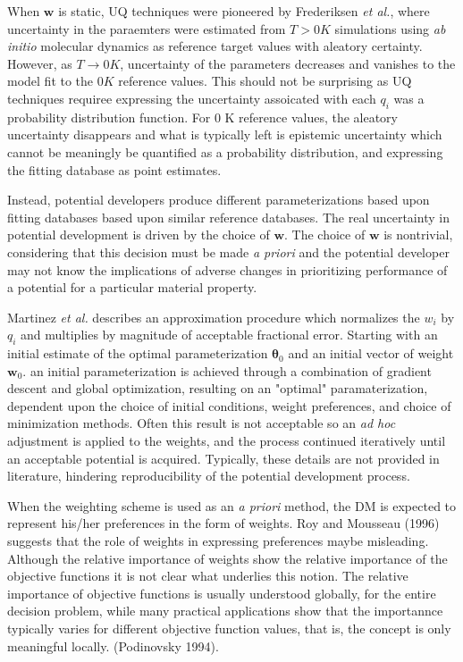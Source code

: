 When $\bm{w}$ is static,  UQ techniques were pioneered by Frederiksen \emph{et al.}\cite{frederiksen2004_md_bayes}, where uncertainty in the paraemters were estimated from $T > 0K$ simulations using \emph{ab initio} molecular dynamics as reference target values with aleatory certainty.  However, as $T \rightarrow 0 K$, uncertainty of the parameters decreases and vanishes to the model fit to the $0K$ reference values.  This should not be surprising as UQ techniques requiree expressing the uncertainty assoicated with each $q_i$ was a probability distribution function.  For $0$ K reference values, the aleatory uncertainty disappears and what is typically left is epistemic uncertainty which cannot be meaningly be quantified as a probability distribution, and expressing the fitting database as point estimates.

Instead, potential developers produce different parameterizations based upon fitting databases based upon similar reference databases.  The real uncertainty in potential development is driven by the choice of $\bm{w}$.  The choice of $\bm{w}$ is nontrivial, considering that this decision must be made \emph{a priori} and the potential developer may not know the implications of adverse changes in prioritizing performance of a potential for a particular material property.

Martinez \emph{et al.}\cite{martinez2013_fitting,martinez2016_posmat} describes an approximation procedure which normalizes the $w_i$ by $q_i$ and multiplies by magnitude of acceptable fractional error.  Starting with an initial estimate of the optimal parameterization $\bm{\theta}_0$ and an initial vector of weight $\bm{w}_0$. an initial parameterization is achieved through a combination of gradient descent and global optimization, resulting on an "optimal" paramaterization, dependent upon the choice of initial conditions, weight preferences, and choice of minimization methods.  Often this result is not acceptable so an \emph{ad hoc} adjustment is applied to the weights, and the process continued iteratively until an acceptable potential is acquired.  Typically, these details are not provided in literature, hindering reproducibility of the potential development process.

When the weighting scheme is used as an \emph{a priori} method, the DM is expected to represent his/her preferences in the form of weights.  Roy and Mousseau (1996) suggests that the role of weights in expressing preferences maybe misleading.  Although the relative importance of weights show the relative importance of the objective functions it is not clear what underlies this notion.  The relative importance of objective functions is usually understood globally, for the entire decision problem, while many practical applications show that the importannce typically varies for different objective function values, that is, the concept is only meaningful locally. (Podinovsky 1994).


